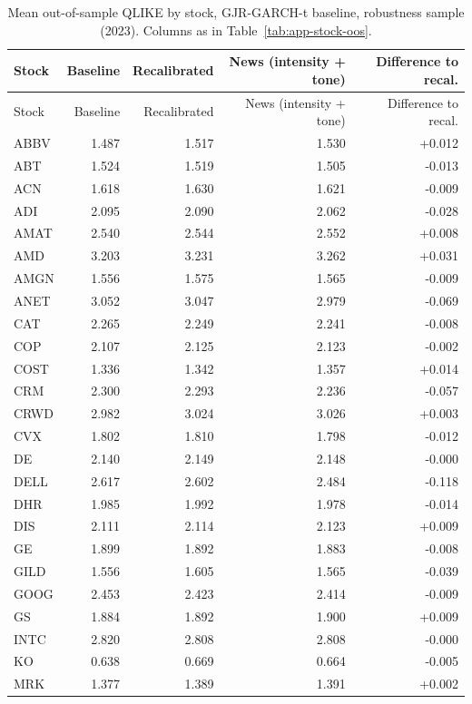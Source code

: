 \documentclass[12pt,a4paper]{article}
\begin{document}
\begin{longtable}{lrrrr}
\caption[Out-of-sample QLIKE by stock, robustness sample]{Mean out-of-sample QLIKE by stock, GJR-GARCH-t baseline, robustness sample (2023). Columns as in Table~\ref{tab:app-stock-oos}.}\label{tab:app-stock-oos-rob}\\
\toprule
Stock & Baseline & Recalibrated & News (intensity + tone) & Difference to recal. \\
\midrule
\endfirsthead
\toprule
Stock & Baseline & Recalibrated & News (intensity + tone) & Difference to recal. \\
\midrule
\endhead
\bottomrule
\endfoot
ABBV & 1.487 & 1.517 & 1.530 & +0.012 \\
ABT & 1.524 & 1.519 & 1.505 & -0.013 \\
ACN & 1.618 & 1.630 & 1.621 & -0.009 \\
ADI & 2.095 & 2.090 & 2.062 & -0.028 \\
AMAT & 2.540 & 2.544 & 2.552 & +0.008 \\
AMD & 3.203 & 3.231 & 3.262 & +0.031 \\
AMGN & 1.556 & 1.575 & 1.565 & -0.009 \\
ANET & 3.052 & 3.047 & 2.979 & -0.069 \\
CAT & 2.265 & 2.249 & 2.241 & -0.008 \\
COP & 2.107 & 2.125 & 2.123 & -0.002 \\
COST & 1.336 & 1.342 & 1.357 & +0.014 \\
CRM & 2.300 & 2.293 & 2.236 & -0.057 \\
CRWD & 2.982 & 3.024 & 3.026 & +0.003 \\
CVX & 1.802 & 1.810 & 1.798 & -0.012 \\
DE & 2.140 & 2.149 & 2.148 & -0.000 \\
DELL & 2.617 & 2.602 & 2.484 & -0.118 \\
DHR & 1.985 & 1.992 & 1.978 & -0.014 \\
DIS & 2.111 & 2.114 & 2.123 & +0.009 \\
GE & 1.899 & 1.892 & 1.883 & -0.008 \\
GILD & 1.556 & 1.605 & 1.565 & -0.039 \\
GOOG & 2.453 & 2.423 & 2.414 & -0.009 \\
GS & 1.884 & 1.892 & 1.900 & +0.009 \\
INTC & 2.820 & 2.808 & 2.808 & -0.000 \\
KO & 0.638 & 0.669 & 0.664 & -0.005 \\
MRK & 1.377 & 1.389 & 1.391 & +0.002 \\

\end{longtable}
\end{document}
